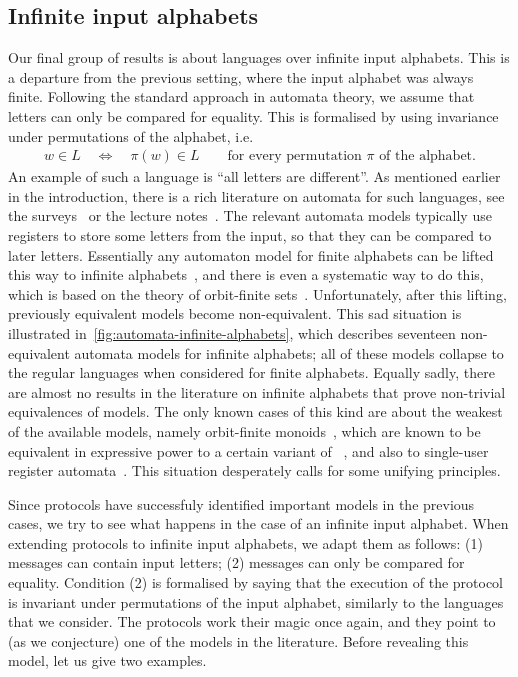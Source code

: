 \subsection{Infinite input alphabets}
\label{sec:intro-infinite}
Our final group of results is about languages over infinite input alphabets. This is a departure from the previous setting, where  the input alphabet was always finite. Following the standard approach in automata theory,  we assume that letters can only be compared for equality. This is formalised by using invariance under  permutations of the alphabet, i.e.
\begin{align*}
w \in L 
\quad \iff \quad
\pi(w) \in L \qquad \text{for every permutation $\pi$ of the alphabet}.
\end{align*}
An example of such a language is ``all letters are different''.
 As mentioned earlier in the introduction, there is a rich literature on automata for such languages, see the surveys~\cite{neven2003power,segoufin2006automata,bojanczykOrbitFiniteSetsTheir2017} or the lecture notes~\cite{bojanczyk_slightly}.  The  relevant automata models typically use registers to store some letters from the input, so that they can be compared to later letters. Essentially any automaton model for finite alphabets can be lifted this way to infinite alphabets~\cite[Figure 1]{neven2003power}, and there is even a systematic way to do this, which is based on the theory of orbit-finite sets~\cite[Chapter 2]{bojanczyk_slightly}. Unfortunately, after this lifting, previously equivalent models become non-equivalent.  This sad situation is illustrated in~\cref{fig:automata-infinite-alphabets}, which describes seventeen non-equivalent automata models for infinite alphabets; all of these models collapse to the regular languages when considered for finite alphabets. Equally sadly, there are almost no results in the literature on infinite alphabets that prove non-trivial equivalences of models. The only known cases of this kind are about the  weakest of the available models, namely orbit-finite monoids~\cite{bojanczykNominalMonoids2013}, which are known to be equivalent in expressive power to a certain variant of \mso~\cite[Theorems 4.2 and 5.1]{DBLP:journals/corr/ColcombetLP14}, and also to single-user register automata~\cite[Theorem 6]{bojanczykstefanski2020}.
This situation desperately calls for some unifying principles. 

Since protocols have successfuly identified important models in the previous cases, we try to see  what happens in the case of an infinite input alphabet.  When extending protocols to infinite input alphabets, we adapt them as follows: (1) messages can contain input letters; (2)  messages can only be compared for equality. Condition (2) is formalised by saying that the execution of the protocol is invariant under permutations of the input alphabet, similarly to the languages that we consider. The protocols  work their magic once again, and they point to (as we conjecture)  one of the models in the literature. Before revealing this model, let us give two examples.


